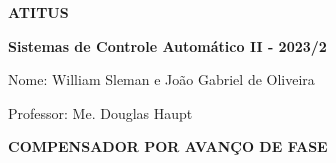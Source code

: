 \documentclass{control}
\begin{document}
\begin{center}
 \textbf{\LARGE{ATITUS}}
 
 \textbf{\Large{Sistemas de Controle Automático II - 2023/2}}\linebreak

\end{center}

\begin{flushleft}
Nome: William Sleman e João Gabriel de Oliveira

Professor: Me. Douglas Haupt
\end{flushleft}

\begin{center}
\textcolor{myBlue}{\textbf{\LARGE{COMPENSADOR POR AVANÇO DE FASE}}}
\end{center}









 \newpage


\end{document}

